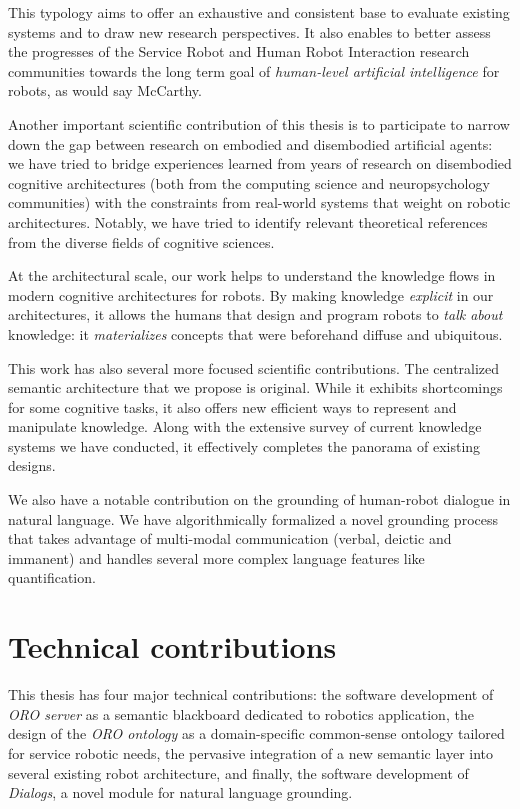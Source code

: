 This typology aims to offer an exhaustive and consistent base to evaluate
existing systems and to draw new research perspectives. It also enables to
better assess the progresses of the Service Robot and Human Robot Interaction
research communities towards the long term goal of \emph{human-level artificial
intelligence} for robots, as would say McCarthy.

Another important scientific contribution of this thesis is to participate to
narrow down the gap between research on embodied and disembodied artificial
agents: we have tried to bridge experiences learned from years of research on
disembodied cognitive architectures (both from the computing science and
neuropsychology communities) with the constraints from real-world systems that
weight on robotic architectures. Notably, we have tried to identify relevant
theoretical references from the diverse fields of cognitive sciences.

At the architectural scale, our work helps to understand the knowledge flows in
modern cognitive architectures for robots. By making knowledge \emph{explicit}
in our architectures, it allows the humans that design and program robots to
\emph{talk about} knowledge: it \emph{materializes} concepts that were
beforehand diffuse and ubiquitous.

This work has also several more focused scientific contributions. The
centralized semantic architecture that we propose is original. While it
exhibits shortcomings for some cognitive tasks, it also offers new efficient
ways to represent and manipulate knowledge. Along with the extensive survey of
current knowledge systems we have conducted, it effectively completes the
panorama of existing designs.

We also have a notable contribution on the grounding of human-robot dialogue in
natural language. We have algorithmically formalized a novel grounding process that
takes advantage of multi-modal communication (verbal, deictic and immanent) and
handles several more complex language features like quantification.

\section{Technical contributions}
\label{sect|technical-contributions}

This thesis has four major technical contributions: the software development of
\emph{ORO server} as a semantic blackboard dedicated to robotics application,
the design of the \emph{ORO ontology} as a domain-specific common-sense
ontology tailored for service robotic needs, the pervasive integration of a new
semantic layer into several existing robot architecture, and finally, the
software development of \emph{Dialogs}, a novel module for natural language
grounding.

